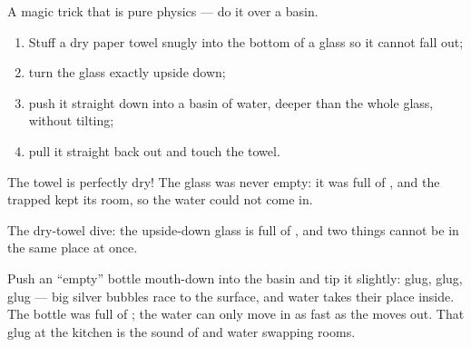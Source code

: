 \begin{method}\label{met:g2:air-around-us:drytowel}
A magic trick that is pure physics --- do it over a basin.
\begin{enumerate}
  \item Stuff a dry paper towel snugly into the bottom of a glass so
        it cannot fall out;
  \item turn the glass exactly upside down;
  \item push it straight down into a basin of water, deeper than the
        whole glass, without tilting;
  \item pull it straight back out and touch the towel.
\end{enumerate}
The towel is perfectly dry! The glass was never empty: it was full
of , and the trapped  kept its room, so the water could not
come in.
\end{method}

\begin{omfigure}

{\small The dry-towel dive: the upside-down glass is full of , and
two things cannot be in the same place at once.}
\end{omfigure}

\begin{example}\label{ex:g2:air-around-us:glug}
Push an ``empty'' bottle mouth-down into the basin and tip it
slightly: glug, glug, glug --- big silver bubbles race to the
surface, and water takes their place inside. The bottle was full of
; the water can only move in as fast as the  moves out. That
glug at the kitchen  is the sound of  and water swapping
rooms.
\end{example}

